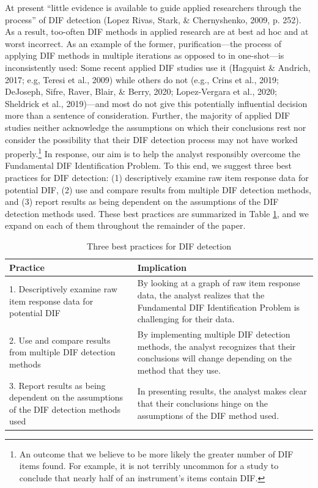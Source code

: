 \documentclass[
  english,
  man,floatsintext]{apa6}
\begin{document}
At present ``little evidence is available to guide applied researchers through the process'' of DIF detection (Lopez Rivas, Stark, \& Chernyshenko, 2009, p. 252). As a result, too-often DIF methods in applied research are at best ad hoc and at worst incorrect. As an example of the former, purification---the process of applying DIF methods in multiple iterations as opposed to in one-shot---is inconsistently used: Some recent applied DIF studies use it (Hagquist \& Andrich, 2017; e.g, Teresi et al., 2009) while others do not (e.g., Crins et al., 2019; DeJoseph, Sifre, Raver, Blair, \& Berry, 2020; Lopez-Vergara et al., 2020; Sheldrick et al., 2019)---and most do not give this potentially influential decision more than a sentence of consideration. Further, the majority of applied DIF studies neither acknowledge the assumptions on which their conclusions rest nor consider the possibility that their DIF detection process may not have worked properly.\footnote{An outcome that we believe to be more likely the greater number of DIF items found. For example, it is not terribly uncommon for a study to conclude that nearly half of an instrument's items contain DIF.} In response, our aim is to help the analyst responsibly overcome the Fundamental DIF Identification Problem. To this end, we suggest three best practices for DIF detection: (1) descriptively examine raw item response data for potential DIF, (2) use and compare results from multiple DIF detection methods, and (3) report results as being dependent on the assumptions of the DIF detection methods used. These best practices are summarized in Table \ref{tab:suggest}, and we expand on each of them throughout the remainder of the paper.

\begin{table}[h]
\caption{Three best practices for DIF detection}
\centering
\begin{tabular}{|p{6cm}|p{9cm}|}
\toprule
 \textbf{Practice} & \textbf{Implication} \\\midrule
 1. Descriptively examine raw item response data for potential DIF & By looking at a graph of raw item response data, the analyst realizes that the Fundamental DIF Identification Problem is challenging for their data.  \\\hline
 2. Use and compare results from multiple DIF detection methods & By implementing multiple DIF detection methods, the analyst recognizes that their conclusions will change depending on the method that they use. \\\hline
 3. Report results as being dependent on the assumptions of the DIF detection methods used & In presenting results, the analyst makes clear that their conclusions hinge on the assumptions of the DIF method used. \\
\bottomrule
\end{tabular}
\label{tab:suggest}
\end{table}
\end{document}
